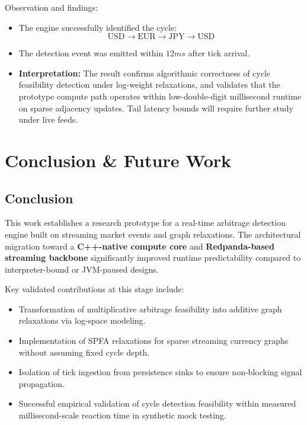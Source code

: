 \documentclass[letterpaper,11pt]{report}
\begin{document}
Observation and findings:

\begin{itemize}
    \item The engine successfully identified the cycle:
    \[
        \text{USD} \rightarrow \text{EUR} \rightarrow \text{JPY} \rightarrow \text{USD}
    \]
    \item The detection event was emitted within $12 ms$ after tick arrival.
    \item \textbf{Interpretation:} The result confirms algorithmic correctness of cycle feasibility detection under log-weight relaxations, and validates that the prototype compute path operates within low-double-digit millisecond runtime on sparse adjacency updates. Tail latency bounds will require further study under live feeds.
\end{itemize}

\chapter{Conclusion \& Future Work}

\section{Conclusion}

This work establishes a research prototype for a real-time arbitrage detection engine built on streaming market events and graph relaxations. 
The architectural migration toward a \textbf{C++-native compute core} and \textbf{Redpanda-based streaming backbone} significantly improved runtime predictability compared to interpreter-bound or JVM-paused designs.

Key validated contributions at this stage include:

\begin{itemize}
    \item Transformation of multiplicative arbitrage feasibility into additive graph relaxations via log-space modeling.
    \item Implementation of SPFA relaxations for sparse streaming currency graphs without assuming fixed cycle depth.
    \item Isolation of tick ingestion from persistence sinks to ensure non-blocking signal propagation.
    \item Successful empirical validation of cycle detection feasibility within measured millisecond-scale reaction time in synthetic mock testing.
\end{itemize}
\end{document}
